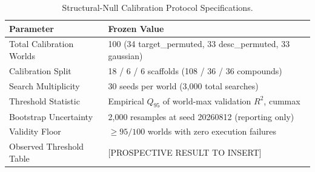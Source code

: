 \begin{table}[t]
\centering
\small
\caption{Structural-Null Calibration Protocol Specifications.}
\label{tab:calibration_design}
\begin{tabular}{ll}
\toprule
Parameter & Frozen Value \\
\midrule
Total Calibration Worlds & 100 (34 target\_permuted, 33 desc\_permuted, 33 gaussian) \\
Calibration Split & 18 / 6 / 6 scaffolds (108 / 36 / 36 compounds) \\
Search Multiplicity & 30 seeds per world (3,000 total searches) \\
Threshold Statistic & Empirical $Q_{95}$ of world-max validation $R^2$, cummax \\
Bootstrap Uncertainty & 2,000 resamples at seed 20260812 (reporting only) \\
Validity Floor & $\ge 95/100$ worlds with zero execution failures \\
\midrule
Observed Threshold Table & [PROSPECTIVE RESULT TO INSERT] \\
\bottomrule
\end{tabular}
\end{table}
